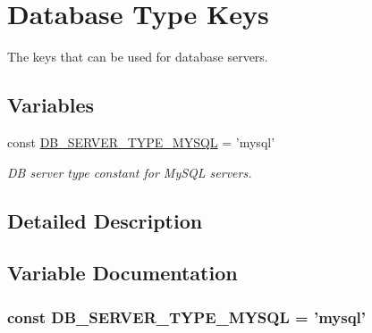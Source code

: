 \hypertarget{group__db__types}{\section{Database Type Keys}
\label{group__db__types}
}


The keys that can be used for database servers.  


\subsection*{Variables}
\begin{DoxyCompactItemize}
\item 
const \hyperlink{group__db__types_gafd3ae7ec92c3a6337eb1037efc55bc18}{D\-B\-\_\-\-S\-E\-R\-V\-E\-R\-\_\-\-T\-Y\-P\-E\-\_\-\-M\-Y\-S\-Q\-L} = 'mysql'
\begin{DoxyCompactList}\small\item\em D\-B server type constant for My\-S\-Q\-L servers. \end{DoxyCompactList}\end{DoxyCompactItemize}


\subsection{Detailed Description}


\subsection{Variable Documentation}
\hypertarget{group__db__types_gafd3ae7ec92c3a6337eb1037efc55bc18}{
\subsubsection[{D\-B\-\_\-\-S\-E\-R\-V\-E\-R\-\_\-\-T\-Y\-P\-E\-\_\-\-M\-Y\-S\-Q\-L}]{\setlength{\rightskip}{0pt plus 5cm}const D\-B\-\_\-\-S\-E\-R\-V\-E\-R\-\_\-\-T\-Y\-P\-E\-\_\-\-M\-Y\-S\-Q\-L = 'mysql'}}\label{group__db__types_gafd3ae7ec92c3a6337eb1037efc55bc18}
